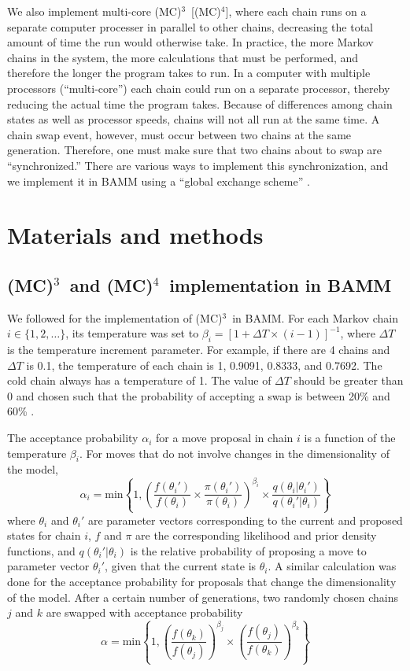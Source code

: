 \documentclass[12pt]{article}
\newcommand{\MCMCMC}{(MC)$^{3}$}
\newcommand{\MCMCMCMC}{(MC)$^{4}$}
\begin{document}
We also implement multi-core \MCMCMC\ [\MCMCMCMC], where each chain
runs on a separate computer processer in parallel to other chains,
decreasing the total amount of time the run would otherwise take.
%
In practice, the more Markov chains in the system,
the more calculations that must be performed,
and therefore the longer the program takes to run.
%
In a computer with multiple processors (``multi-core'')
each chain could run on a separate processor,
thereby reducing the actual time the program takes.
%
Because of differences among chain states as well as processor speeds,
chains will not all run at the same time.
%
A chain swap event, however, must occur between two chains
at the same generation.
%
Therefore, one must make sure that two chains about to swap
are ``synchronized.''
%
There are various ways to implement this synchronization,
and we implement it in BAMM using a ``global exchange scheme'' \citep{alt04}.


\section*{Materials and methods}

\subsection*{\MCMCMC\ and \MCMCMCMC\ implementation in BAMM}

We followed \citet{alt04} for the implementation of \MCMCMC\ in BAMM.
%
For each Markov chain $i \in \{1, 2, \dots\}$, its temperature was set to
$\beta_i = [1 + \Delta T \times (i - 1)]^{-1}$,
where $\Delta T$ is the temperature increment parameter.
%
For example, if there are 4 chains and $\Delta T$ is 0.1,
the temperature of each chain is 1, 0.9091, 0.8333, and 0.7692.
%
The cold chain always has a temperature of 1.
%
The value of $\Delta T$ should be greater than 0
and chosen such that the probability of accepting a swap
is between 20\% and 60\% \citep{alt04}.


The acceptance probability $\alpha_i$ for a move proposal in chain $i$
is a function of the temperature $\beta_i$.
%
For moves that do not involve changes in the dimensionality of the model,
\[\alpha_i = \text{min}\left\{ 1,
    \left(
    \frac{f(\theta_i')}{f(\theta_i)} \times
    \frac{\pi(\theta_i')}{\pi(\theta_i)}
    \right)^{\beta_i} \times
    \frac{q(\theta_i | \theta_i')}{q(\theta_i' | \theta_i)}
\right\}\]
where $\theta_i$ and $\theta_i'$ are parameter vectors
corresponding to the current and proposed states for chain $i$,
$f$ and $\pi$ are the corresponding likelihood and prior density functions,
and $q(\theta_i' | \theta_i)$ is the relative probability
of proposing a move to parameter vector $\theta_i'$,
given that the current state is $\theta_i$.
%
A similar calculation was done for the acceptance probability for proposals
that change the dimensionality of the model.
%
After a certain number of generations, two randomly chosen chains $j$ and $k$
are swapped with acceptance probability
\[\alpha = \text{min}\left\{ 1,
    \left(\frac{f(\theta_k)}{f(\theta_j)}\right)^{\beta_j} \times
    \left(\frac{f(\theta_j)}{f(\theta_k)}\right)^{\beta_k}
\right\}\]
\end{document}
